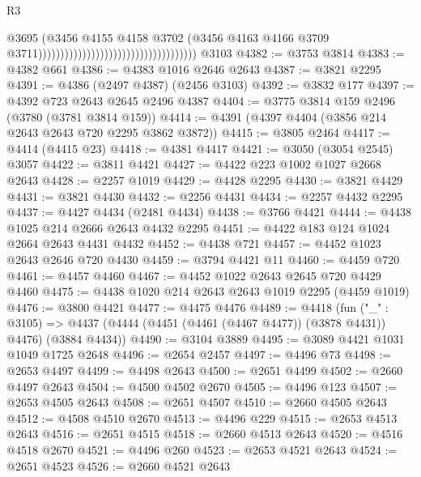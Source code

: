\begin{lexlean}{R3}
\begin{coremodule}
                                                                        @3695
                                                                        (@3456
                                                                          @4155
                                                                          @4158
                                                                          @3702
                                                                          (@3456
                                                                            @4163
                                                                            @4166
                                                                            @3709
                                                                            @3711))))))))))))))))))))))))))))))))))))
    @3103
@4382 := @3753 @3814
@4383 := @4382 @661
@4386 := @4383 @1016 @2646 @2643
@4387 := @3821 @2295
@4391 := @4386 (@2497 @4387) (@2456 @3103)
@4392 := @3832 @177
@4397 := @4392 @723 @2643 @2645 @2496 @4387
@4404 := @3775 @3814 @159 @2496 (@3780 (@3781 @3814 @159))
@4414 := @4391 (@4397 @4404 (@3856 @214 @2643 @2643 @720 @2295 @3862 @3872))
@4415 := @3805 @2464
@4417 := @4414 (@4415 @23)
@4418 := @4381 @4417
@4421 := @3050 (@3054 @2545) @3057
@4422 := @3811 @4421
@4427 := @4422 @223 @1002 @1027 @2668 @2643
@4428 := @2257 @1019
@4429 := @4428 @2295
@4430 := @3821 @4429
@4431 := @3821 @4430
@4432 := @2256 @4431
@4434 := @2257 @4432 @2295
@4437 := @4427 @4434 (@2481 @4434)
@4438 := @3766 @4421
@4444 := @4438 @1025 @214 @2666 @2643 @4432 @2295
@4451 := @4422 @183 @124 @1024 @2664 @2643 @4431 @4432
@4452 := @4438 @721
@4457 := @4452 @1023 @2643 @2646 @720 @4430
@4459 := @3794 @4421 @11
@4460 := @4459 @720
@4461 := @4457 @4460
@4467 := @4452 @1022 @2643 @2645 @720 @4429 @4460
@4475 := @4438 @1020 @214 @2643 @2643 @1019 @2295 (@4459 @1019)
@4476 := @3800 @4421
@4477 := @4475 @4476
@4489 := @4418
    (fun ("_" : @3105) =>
    @4437 (@4444 (@4451 (@4461 (@4467 @4477)) (@3878 @4431)) @4476) (@3884 @4434))
@4490 := @3104 @3889
@4495 := @3089 @4421 @1031 @1049 @1725 @2648
@4496 := @2654 @2457
@4497 := @4496 @73
@4498 := @2653 @4497
@4499 := @4498 @2643
@4500 := @2651 @4499
@4502 := @2660 @4497 @2643
@4504 := @4500 @4502 @2670
@4505 := @4496 @123
@4507 := @2653 @4505 @2643
@4508 := @2651 @4507
@4510 := @2660 @4505 @2643
@4512 := @4508 @4510 @2670
@4513 := @4496 @229
@4515 := @2653 @4513 @2643
@4516 := @2651 @4515
@4518 := @2660 @4513 @2643
@4520 := @4516 @4518 @2670
@4521 := @4496 @260
@4523 := @2653 @4521 @2643
@4524 := @2651 @4523
@4526 := @2660 @4521 @2643

\end{coremodule}
\end{lexlean}
